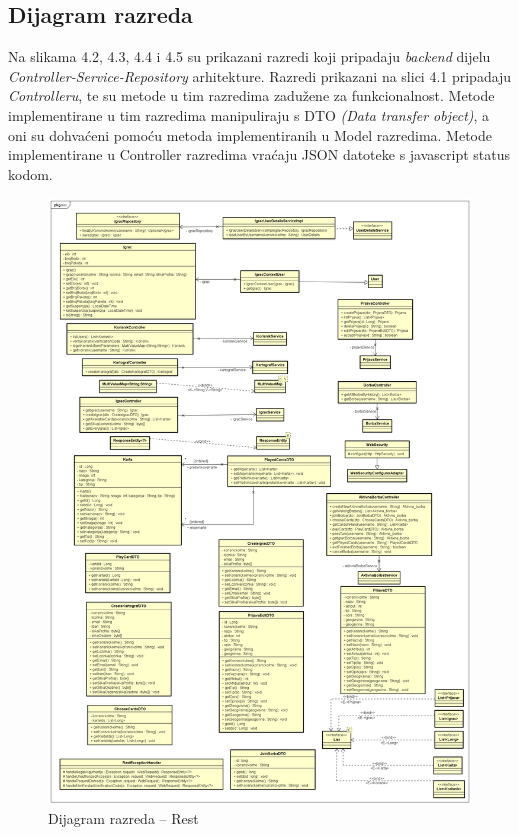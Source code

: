 \begin{itemize}
		\eject


		\section{Dijagram razreda}

		Na slikama 4.2, 4.3, 4.4 i 4.5 su prikazani razredi koji pripadaju \textit{backend} dijelu \textit{Controller-Service-Repository} arhitekture. Razredi prikazani na slici 4.1 pripadaju \textit{Controlleru}, te su metode u tim razredima zadužene za funkcionalnost. Metode implementirane u tim razredima manipuliraju s DTO \textit{(Data transfer object)}, a oni su dohvaćeni pomoću metoda implementiranih u Model razredima. Metode implementirane u Controller razredima vraćaju JSON datoteke s javascript status kodom.

		\begin{figure}[H]
			\includegraphics[width=\textwidth]{slike/Rest.png}
			\centering
			\caption{Dijagram razreda – Rest}
			\label{fig:promjene}
		\end{figure}


\end{itemize}
